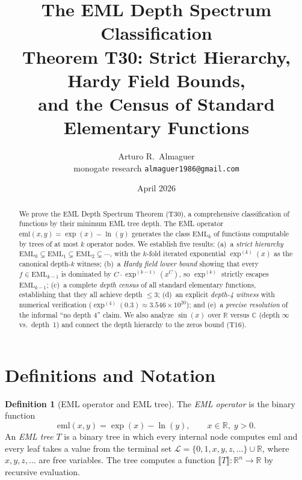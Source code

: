 \documentclass[12pt,a4paper]{article}
\title{The EML Depth Spectrum Classification\\
       \large Theorem T30: Strict Hierarchy, Hardy Field Bounds,\\
       and the Census of Standard Elementary Functions}
\author{Arturo R.\ Almaguer\\
\small monogate research \quad \texttt{almaguer1986@gmail.com}}
\date{April 2026}
\theoremstyle{definition}
\newtheorem{definition}[theorem]{Definition}
\theoremstyle{remark}
\begin{document}
\maketitle
\tableofcontents

\begin{abstract}
We prove the EML Depth Spectrum Theorem (T30), a comprehensive classification
of functions by their minimum EML tree depth.  The EML operator
$\mathrm{eml}(x,y)=\exp(x)-\ln(y)$ generates the class $\mathrm{EML}_k$ of
functions computable by trees of at most $k$ operator nodes.  We establish
five results: (a)~a \emph{strict hierarchy}
$\mathrm{EML}_0\subsetneq\mathrm{EML}_1\subsetneq\mathrm{EML}_2\subsetneq\cdots$,
with the $k$-fold iterated exponential $\exp^{(k)}(x)$ as the canonical
depth-$k$ witness; (b)~a \emph{Hardy field lower bound} showing that every
$f\in\mathrm{EML}_{k-1}$ is dominated by $C\cdot\exp^{(k-1)}(x^C)$, so
$\exp^{(k)}$ strictly escapes $\mathrm{EML}_{k-1}$; (c)~a complete
\emph{depth census} of all standard elementary functions, establishing that
they all achieve depth $\leq 3$; (d)~an explicit \emph{depth-4 witness} with
numerical verification ($\exp^{(4)}(0.3)\approx 3.546\times 10^{20}$); and
(e)~a \emph{precise resolution} of the informal ``no depth 4'' claim.  We also
analyze $\sin(x)$ over $\mathbb{R}$ versus $\mathbb{C}$ (depth $\infty$ vs.\
depth~1) and connect the depth hierarchy to the zeros bound (T16).
\end{abstract}

\section{Definitions and Notation}

\begin{definition}[EML operator and EML tree]\label{def:eml-tree}
The \emph{EML operator} is the binary function
\[
  \mathrm{eml}(x,y) = \exp(x) - \ln(y), \qquad x\in\mathbb{R},\; y>0.
\]
An \emph{EML tree} $T$ is a binary tree in which every internal node computes
$\mathrm{eml}$ and every leaf takes a value from the terminal set
$\mathcal{L}=\{0,1,x,y,z,\ldots\}\cup\mathbb{R}$,
where $x,y,z,\ldots$ are free variables.  The tree computes a function
$\llbracket T\rrbracket:\mathbb{R}^n\to\mathbb{R}$ by recursive evaluation.
\end{definition}
\end{document}
